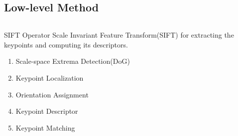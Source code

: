 \documentclass[unknownkeysallowed]{beamer}
\begin{document}
	\subsection{Low-level Method}
	\begin{frame}
		\begin{columns}
			
		\begin{column}{0.95\paperwidth}
		\begin{block}{SIFT Operator\cite{ng2003sift}}
			Scale Invariant Feature Transform(SIFT) for extracting the keypoints and computing its descriptors.
			\begin{enumerate}
				\item Scale-space Extrema Detection(DoG)
				\item Keypoint Localization
				\item Orientation Assignment
				\item Keypoint Descriptor
				\item Keypoint Matching
			\end{enumerate}
		\end{block}
		\end{column}
		\end{columns}
		
		\vspace{-6mm}
		\begin{columns}
			

\end{columns}
\end{frame}
\end{document}
